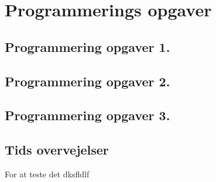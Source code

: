 \section{Programmerings opgaver}



\subsection*{Programmering opgaver 1.}



\subsection*{Programmering opgaver 2.}



\subsection*{Programmering opgaver 3.}

\subsection*{Tids overvejelser}
For at teste det dksfldlf